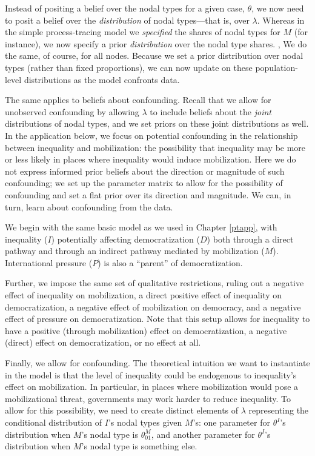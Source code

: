 \documentclass[
  12pt,
]{book}
\begin{document}
Instead of positing a belief over the nodal types for a given case, \(\theta\), we now need to posit a belief over the \emph{distribution} of nodal types---that is, over \(\lambda\). Whereas in the simple process-tracing model we \emph{specified} the shares of nodal types for \(M\) (for instance), we now specify a prior \emph{distribution} over the nodal type shares. , We do the same, of course, for all nodes. Because we set a prior distribution over nodal types (rather than fixed proportions), we can now update on these population-level distributions as the model confronts data.

The same applies to beliefs about confounding. Recall that we allow for unobserved confounding by allowing \(\lambda\) to include beliefs about the \emph{joint} distributions of nodal types, and we set priors on these joint distributions as well. In the application below, we focus on potential confounding in the relationship between inequality and mobilization: the possibility that inequality may be more or less likely in places where inequality would induce mobilization. Here we do not express informed prior beliefs about the direction or magnitude of such confounding; we set up the parameter matrix to allow for the possibility of confounding and set a flat prior over its direction and magnitude. We can, in turn, learn about confounding from the data.

We begin with the same basic model as we used in Chapter \ref{ptapp}, with inequality (\(I\)) potentially affecting democratization (\(D\)) both through a direct pathway and through an indirect pathway mediated by mobilization (\(M\)). International pressure (\(P\)) is also a ``parent'' of democratization.

Further, we impose the same set of qualitative restrictions, ruling out a negative effect of inequality on mobilization, a direct positive effect of inequality on democratization, a negative effect of mobilization on democracy, and a negative effect of pressure on democratization. Note that this setup allows for inequality to have a positive (through mobilization) effect on democratization, a negative (direct) effect on democratization, or no effect at all.

Finally, we allow for confounding. The theoretical intuition we want to instantiate in the model is that the level of inequality could be endogenous to inequality's effect on mobilization. In particular, in places where mobilization would pose a mobilizational threat, governments may work harder to reduce inequality. To allow for this possibility, we need to create distinct elements of \(\lambda\) representing the conditional distribution of \(I\)'s nodal types given \(M\)'s: one parameter for \(\theta^I\)'s distribution when \(M\)'s nodal type is \(\theta^M_{01}\), and another parameter for \(\theta^I\)'s distribution when \(M\)'s nodal type is something else.
\end{document}
